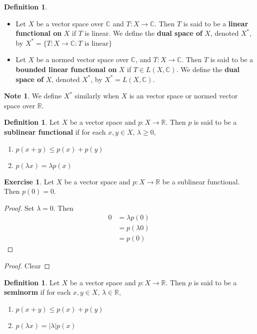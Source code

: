 \documentclass[12pt]{amsart}
\theoremstyle{definition}
\newtheorem{defn}[definition]{Definition}
\newtheorem{note}[definition]{Note}
\newtheorem{ex}[definition]{Exercise}
\newcommand{\lam}{\lambda}
\newcommand{\C}{\mathbb{C}}
\newcommand{\R}{\mathbb{R}}
\begin{document}
	\begin{defn}\
		\begin{itemize}
		\item Let $X$ be a vector space over $\C$ and $T :X \rightarrow \C$. Then $T$ is said to be a \textbf{linear functional on} $X$ if $T$ is linear. We define the \textbf{dual space of} $X$, denoted $X^*$, by $ X^* = \{ T:X \rightarrow \C: T \text{ is linear} \} $
		\item Let $X$ be a normed vector space over $\C$, and $T :X \rightarrow \C$. Then $T$ is said to be a \textbf{bounded linear functional on} $X$ if $T \in L(X, \C)$. We define the \textbf{dual space of} $X$, denoted $X^*$, by $X^* = L(X, \C)$.
		\end{itemize}
	\end{defn}
	
	\begin{note}
	We define $X^*$ similarly when $X$ is an vector space or normed vector space over $\R$.
	\end{note}
	
	\begin{defn}
		Let $X$ be a vector space and $p:X \rightarrow \R$. Then $p$ is said to be a \textbf{sublinear functional} if for each $x,y \in X$, $\lam \geq 0$, 
		\begin{enumerate}
			\item $p(x+y) \leq p(x) + p(y)$
			\item $p(\lam x ) = \lam p(x)$
		\end{enumerate}  
	\end{defn}
	
	\begin{ex}
		Let $X$ be a vector space and $p: X \rightarrow \R$ be a sublinear functional. Then $p(0) = 0$.
	\end{ex}
	
	\begin{proof} Set $\lam = 0$. Then 
	\begin{align*}
	0
	&= \lam p(0) \\
	&= p(\lam 0) \\
	&= p(0)
	\end{align*}
	\end{proof}
	
	\begin{proof}
	Clear
	\end{proof}
	
	\begin{defn}
		Let $X$ be a vector space and $p:X \rightarrow \R$. Then $ p$ is said to be a \textbf{seminorm} if for each $x,y \in X$, $\lam \in \R$, 
		\begin{enumerate}
			\item $p(x+y) \leq p(x) + p(y)$
			\item $p(\lam x) = |\lam| p(x)$
		\end{enumerate}  
	\end{defn}
	
\end{document}
